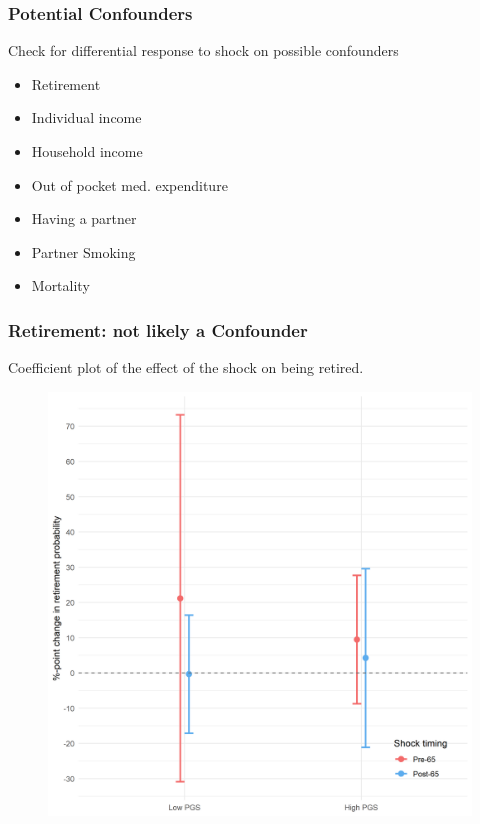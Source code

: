 \documentclass[10pt,compress,xcolor=dvipsnames,aspectratio=169]{beamer}    %
\newcounter{ex}
\newcommand{\1}[1]{\mathrm{1\hspace*{-2.5pt}l}[#1]}	%
\begin{document}
\begin{frame}
\frametitle{Potential Confounders}
\label{frame:Confounders}
Check for differential response to shock on possible confounders \cite{Pei2018}
\begin{itemize}
	\item Retirement 		\hyperlink{fig:retire}{\beamergotobutton{}}
	\item Individual income \hyperlink{fig:wage}{\beamergotobutton{}}
	\item Household income	\hyperlink{fig:hhinc}{\beamergotobutton{}}
	\item Out of pocket med. expenditure   \hyperlink{fig:oome}{\beamergotobutton{}}
	\item Having a partner	\hyperlink{fig:mpart}{\beamergotobutton{}}
	\item Partner Smoking	\hyperlink{fig:smokePartner}{\beamergotobutton{}}
	\item Mortality \hyperlink{fig:dead2}{} \hyperlink{fig:dead5}{}
\end{itemize}

\end{frame}

\begin{frame}
\frametitle{Retirement: not likely a Confounder}
Coefficient plot of the effect of the shock on being retired.
\begin{figure}[hbtp]
\centering
\includegraphics[height=0.8\textheight]{../../3_output/shock_effects/retired_6070_100_cv.png}
\label{fig:retire}
\end{figure}
\end{frame}
\end{document}
